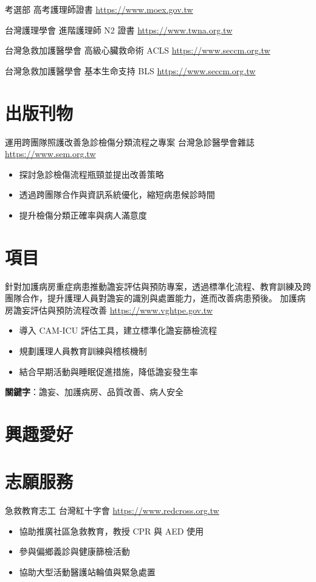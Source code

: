 \documentclass[a4paper, serif, 10pt]{moderncv}
\begin{document}
        {考選部}
        {高考護理師證書}
        {\url{https://www.moex.gov.tw}}
        {}
        {}

        {台灣護理學會}
        {進階護理師 N2 證書}
        {\url{https://www.twna.org.tw}}
        {}
        {}

        {台灣急救加護醫學會}
        {高級心臟救命術 ACLS}
        {\url{https://www.seccm.org.tw}}
        {}
        {}

        {台灣急救加護醫學會}
        {基本生命支持 BLS}
        {\url{https://www.seccm.org.tw}}
        {}
        {}
\section{出版刊物}

        {運用跨團隊照護改善急診檢傷分類流程之專案}
        {台灣急診醫學會雜誌}
        {\url{https://www.sem.org.tw}}
        {}
        {\begin{itemize}
\item 探討急診檢傷流程瓶頸並提出改善策略
\item 透過跨團隊合作與資訊系統優化，縮短病患候診時間
\item 提升檢傷分類正確率與病人滿意度
\end{itemize}}
\section{項目}

        {針對加護病房重症病患推動譫妄評估與預防專案，透過標準化流程、教育訓練及跨團隊合作，提升護理人員對譫妄的識別與處置能力，進而改善病患預後。}
        {加護病房譫妄評估與預防流程改善}
        {\url{https://www.vghtpe.gov.tw}}
        {}
        {\begin{itemize}
\item 導入 CAM-ICU 評估工具，建立標準化譫妄篩檢流程
\item 規劃護理人員教育訓練與稽核機制
\item 結合早期活動與睡眠促進措施，降低譫妄發生率
\end{itemize}
\textbf{關鍵字}：譫妄、加護病房、品質改善、病人安全}
\section{興趣愛好}

\section{志願服務}

        {急救教育志工}
        {台灣紅十字會}
        {\url{https://www.redcross.org.tw}}
        {}
        {\begin{itemize}
\item 協助推廣社區急救教育，教授 CPR 與 AED 使用
\item 參與偏鄉義診與健康篩檢活動
\item 協助大型活動醫護站輪值與緊急處置
\end{itemize}}
    
\end{document}

